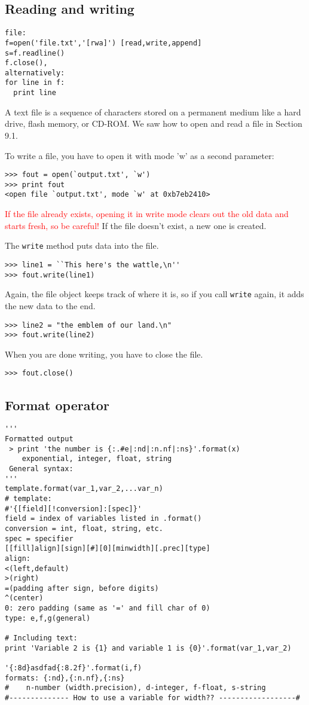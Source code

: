 \documentclass{article}
\begin{document}
\subsection{Reading and writing}
\begin{verbatim}
file:
f=open('file.txt','[rwa]') [read,write,append]
s=f.readline()
f.close(),
alternatively:
for line in f:
  print line
\end{verbatim}
\par A text file is a sequence of characters stored on a permanent medium
like a hard drive, flash memory, or CD-ROM. We saw how to open and
read a file in Section 9.1.
\par To write a file, you have to open it with mode 'w' as a second
parameter:
\begin{verbatim}
>>> fout = open(`output.txt', `w')
>>> print fout
<open file `output.txt', mode `w' at 0xb7eb2410>
\end{verbatim}
\par \textcolor{red}{If the file already exists, opening it in
write mode clears out the
old data and starts fresh, so be careful!} If the file doesn't
exist, a new one is created.
\par The \verb|write| method puts data into the file.
\begin{verbatim}
>>> line1 = ``This here's the wattle,\n''
>>> fout.write(line1)
\end{verbatim}
\par Again, the file object keeps track of where it is, so if you call
\verb|write| again, it adds the new data to the end.
\begin{verbatim}
>>> line2 = "the emblem of our land.\n"
>>> fout.write(line2)
\end{verbatim}
\par When you are done writing, you have to close the file.
\begin{verbatim}
>>> fout.close()
\end{verbatim}

\subsection{Format operator}

\begin{verbatim}
'''
Formatted output
 > print 'the number is {:.#e|:nd|:n.nf|:ns}'.format(x)
    exponential, integer, float, string
 General syntax:
'''
template.format(var_1,var_2,...var_n)
# template:
#'{[field][!conversion]:[spec]}'
field = index of variables listed in .format()
conversion = int, float, string, etc.
spec = specifier
[[fill]align][sign][#][0][minwidth][.prec][type]
align:
<(left,default)
>(right)
=(padding after sign, before digits)
^(center)
0: zero padding (same as '=' and fill char of 0)
type: e,f,g(general)

# Including text:
print 'Variable 2 is {1} and variable 1 is {0}'.format(var_1,var_2)

'{:8d}asdfad{:8.2f}'.format(i,f)
formats: {:nd},{:n.nf},{:ns}
#    n-number (width.precision), d-integer, f-float, s-string
#-------------- How to use a variable for width?? ------------------#
\end{verbatim}
\end{document}
